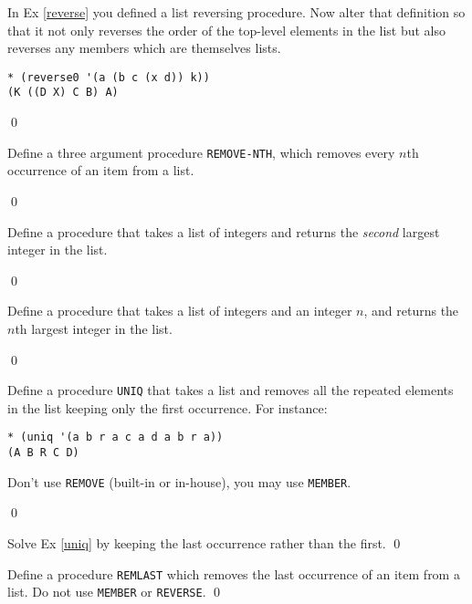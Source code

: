 \documentclass[a4paper,11pt]{article}
\begin{document}
\begin{uexercise}

In Ex \ref{reverse} you defined a list reversing procedure. Now alter that definition so that it  not only reverses the order of the top-level elements in the list but also reverses any members which are themselves lists.

{\small
\begin{Verbatim}
* (reverse0 '(a (b c (x d)) k))
(K ((D X) C B) A)
\end{Verbatim}
}
\qed
\end{uexercise}

\begin{uexercise}
Define a three argument procedure \Verb+REMOVE-NTH+, which removes every $n$th occurrence of an item from a list.

\qed
\end{uexercise}

\begin{uexercise}
Define a procedure that takes a list of integers and returns the \emph{second} largest integer in the list.

\qed
\end{uexercise}

\begin{uexercise}
Define a procedure that takes a list of integers and an integer $n$, and returns the $n$th largest integer in the list.

\qed
\end{uexercise}
\begin{uexercise}
\label{uniq}
Define a procedure \Verb+UNIQ+ that takes a list and removes all the repeated elements in the list keeping only the first occurrence. For instance:

\begin{Verbatim}
* (uniq '(a b r a c a d a b r a))
(A B R C D)
\end{Verbatim}

Don't use \Verb+REMOVE+ (built-in or in-house), you may use \Verb+MEMBER+.


\qed
\end{uexercise}
\begin{uexercise}
Solve Ex \ref{uniq} by keeping the last occurrence rather than the first.
\qed
\end{uexercise}

\begin{uexercise}
Define a procedure \Verb+REMLAST+ which removes the last occurrence of an item from a list. Do not use \Verb+MEMBER+ or \Verb+REVERSE+.
\qed
\end{uexercise}
\end{document}
